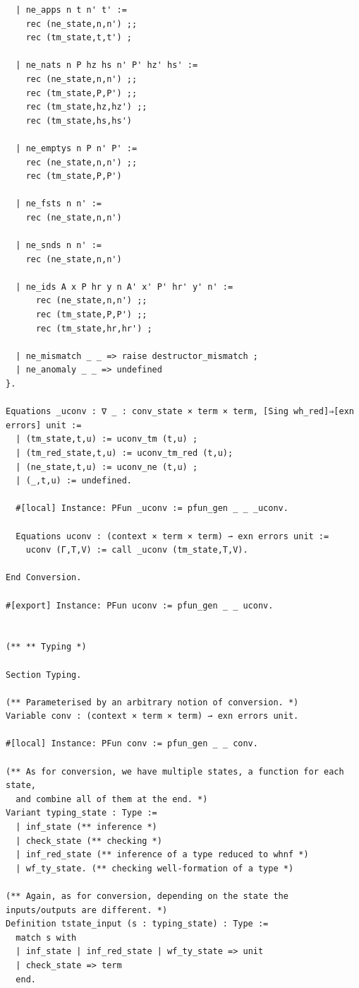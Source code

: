 \begin{lstlisting}
  | ne_apps n t n' t' :=
    rec (ne_state,n,n') ;;
    rec (tm_state,t,t') ;

  | ne_nats n P hz hs n' P' hz' hs' :=
    rec (ne_state,n,n') ;;
    rec (tm_state,P,P') ;;
    rec (tm_state,hz,hz') ;;
    rec (tm_state,hs,hs')

  | ne_emptys n P n' P' :=
    rec (ne_state,n,n') ;;
    rec (tm_state,P,P')

  | ne_fsts n n' :=
    rec (ne_state,n,n')

  | ne_snds n n' :=
    rec (ne_state,n,n')

  | ne_ids A x P hr y n A' x' P' hr' y' n' :=
      rec (ne_state,n,n') ;;
      rec (tm_state,P,P') ;;
      rec (tm_state,hr,hr') ;

  | ne_mismatch _ _ => raise destructor_mismatch ;
  | ne_anomaly _ _ => undefined
}.

Equations _uconv : ∇ _ : conv_state × term × term, [Sing wh_red]⇒[exn errors] unit :=
  | (tm_state,t,u) := uconv_tm (t,u) ;
  | (tm_red_state,t,u) := uconv_tm_red (t,u);
  | (ne_state,t,u) := uconv_ne (t,u) ;
  | (_,t,u) := undefined.

  #[local] Instance: PFun _uconv := pfun_gen _ _ _uconv.

  Equations uconv : (context × term × term) ⇀ exn errors unit :=
    uconv (Γ,T,V) := call _uconv (tm_state,T,V).
  
End Conversion.

#[export] Instance: PFun uconv := pfun_gen _ _ uconv.


(** ** Typing *)

Section Typing.

(** Parameterised by an arbitrary notion of conversion. *)
Variable conv : (context × term × term) ⇀ exn errors unit.

#[local] Instance: PFun conv := pfun_gen _ _ conv.

(** As for conversion, we have multiple states, a function for each state,
  and combine all of them at the end. *)
Variant typing_state : Type :=
  | inf_state (** inference *)
  | check_state (** checking *)
  | inf_red_state (** inference of a type reduced to whnf *)
  | wf_ty_state. (** checking well-formation of a type *)

(** Again, as for conversion, depending on the state the inputs/outputs are different. *)
Definition tstate_input (s : typing_state) : Type :=
  match s with
  | inf_state | inf_red_state | wf_ty_state => unit
  | check_state => term
  end.


\end{lstlisting}
